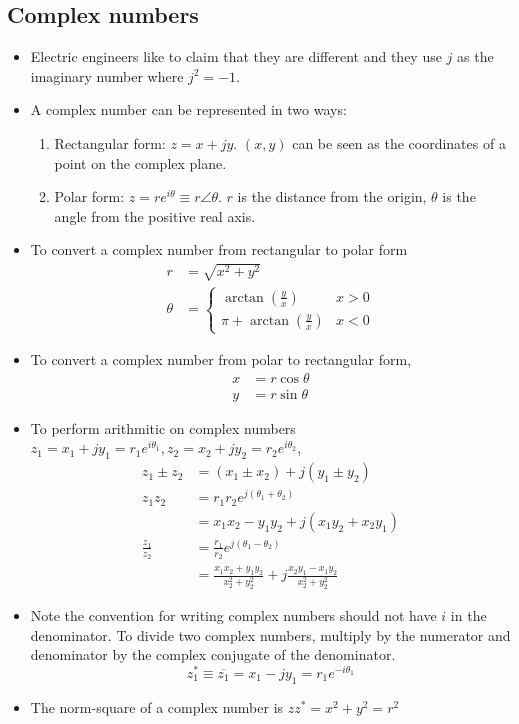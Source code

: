 \documentclass{article}
\begin{document}
\subsection{Complex numbers}
\begin{itemize}
    \item Electric engineers like to claim that they are different and they use $j$ as the imaginary number where $j^2=-1$.
    \item A complex number can be represented in two ways:
    \begin{enumerate}
        \item Rectangular form: $z=x+jy$. $(x,y)$ can be seen as the coordinates of a point on the complex plane.
        \item Polar form: $z=re^{i\theta}\equiv r\angle\theta$. $r$ is the distance from the origin, $\theta$ is the angle from the positive real axis.
    \end{enumerate}
    \item To convert a complex number from rectangular to polar form
    \begin{align}
        r&=\sqrt{x^2+y^2}\\
        \theta&=\begin{cases}
            \arctan\left(\frac{y}{x}\right) & x>0\\
            \pi + \arctan\left(\frac{y}{x}\right) & x < 0
        \end{cases}
    \end{align}
    \item To convert a complex number from polar to rectangular form,
    \begin{align}
        x&=r\cos\theta\\
        y&=r\sin\theta
    \end{align}
    \item To perform arithmitic on complex numbers $z_1=x_1+jy_1=r_1e^{i\theta_1}, z_2=x_2+jy_2=r_2e^{i\theta_2}$, 
    \begin{align}
        z_1\pm z_2&=(x_1\pm x_2)+j(y_1\pm y_2)\\
        z_1z_2&=r_1r_2e^{j(\theta_1+\theta_2)}\\
        &=x_1x_2-y_1y_2+j(x_1y_2+x_2y_1)\\
        \frac{z_1}{z_2}&=\frac{r_1}{r_2}e^{j(\theta_1-\theta_2)}\\
        &=\frac{x_1x_2+y_1y_2}{x_2^2+y_2^2}+j\frac{x_2y_1-x_1y_2}{x_2^2+y_2^2}
    \end{align}
    \item Note the convention for writing complex numbers should not have $i$ in the denominator. To divide two complex numbers, multiply by the numerator and denominator by the complex conjugate of the denominator.
    \begin{equation}
        z_1^*\equiv\overline{z_1}=x_1-jy_1=r_1e^{-i\theta_1}
    \end{equation}
    \item The norm-square of a complex number is $zz^*=x^2+y^2=r^2$
\end{itemize}
\end{document}
